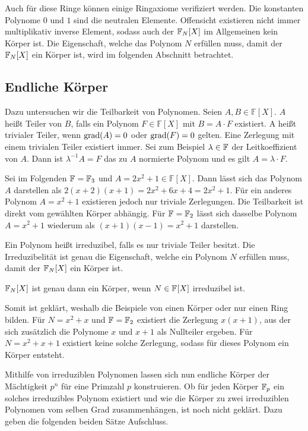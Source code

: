 Auch für diese Ringe können einige Ringaxiome verifiziert werden. Die konstanten Polynome $0$ und $1$ sind die neutralen Elemente. Offensicht existieren nicht immer multiplikativ inverse Element, sodass auch der $\field{N} {[X]}$ im Allgemeinen kein Körper ist. Die Eigenschaft, welche das Polynom $N$ erfüllen muss, damit der $\field{N} {[X]}$ ein Körper ist, wird im folgenden Abschnitt betrachtet.

\subsection{Endliche Körper}

Dazu untersuchen wir die Teilbarkeit von Polynomen. Seien $A,B \in \mathbb{F} {[X]}$. $A$ heißt Teiler von $B$, falls ein Polynom $F \in \mathbb{F} {[X]}$ mit $B = A \cdot F$ existiert. A heißt trivialer Teiler, wenn $\mathrm{grad}(A) = 0$ oder $\mathrm{grad}(F) = 0$ gelten. Eine Zerlegung mit einem trivialen Teiler existiert immer. Sei zum Beispiel $\lambda \in \field{}$  der Leitkoeffizient von $A$. Dann ist $\lambda^{-1}A = F$ das zu $A$ normierte Polynom und es gilt $A = \lambda\cdot F$.

Sei im Folgenden $\field{} = \field{3}$ und $A=2x^2 + 1 \in \mathbb{F} {[X]}$. Dann lässt sich das Polynom $A$ darstellen als $2(x+2)(x+1) = 2x^2 + 6x + 4 = 2x^2 + 1$. Für ein anderes Polynom $A=x^2 + 1$ existieren jedoch nur triviale Zerlegungen. Die Teilbarkeit ist direkt vom gewählten Körper abhängig. Für $\field{} = \field{2}$ lässt sich dasselbe Polynom $A=x^2 + 1$ wiederum als $(x+1)(x-1)=x^2 + 1$ darstellen.

Ein Polynom heißt irreduzibel, falls es nur triviale Teiler besitzt. Die Irreduzibelität ist genau die Eigenschaft, welche ein Polynom $N$ erfüllen muss, damit der $\field{N} {[X]}$ ein Körper ist. 

\begin{satz}
    $\field{N} {[X]}$ ist genau dann ein Körper, wenn $N \in \field{}{[X]}$ irreduzibel ist. 
\end{satz}

Somit ist geklärt, weshalb die Beispiele von  einen Körper oder nur einen Ring bilden. Für $N=x^2 + x$ und $\field{} = \field{2}$ existiert die Zerlegung $x(x+1)$, aus der sich zusätzlich die Polynome $x$ und $x+1$ als Nullteiler ergeben. Für $N=x^2 + x + 1$ existiert keine solche Zerlegung, sodass für dieses Polynom ein Körper entsteht.

Mithilfe von irreduziblen Polynomen lassen sich nun endliche Körper der Mächtigkeit $p^n$ für eine Primzahl $p$ konstruieren. Ob für jeden Körper $\field{p}$ ein solches irreduzibles Polynom existiert und wie die Körper zu zwei irreduziblen Polynomen vom selben Grad zusammenhängen, ist noch nicht geklärt. Dazu geben die folgenden beiden Sätze Aufschluss.

